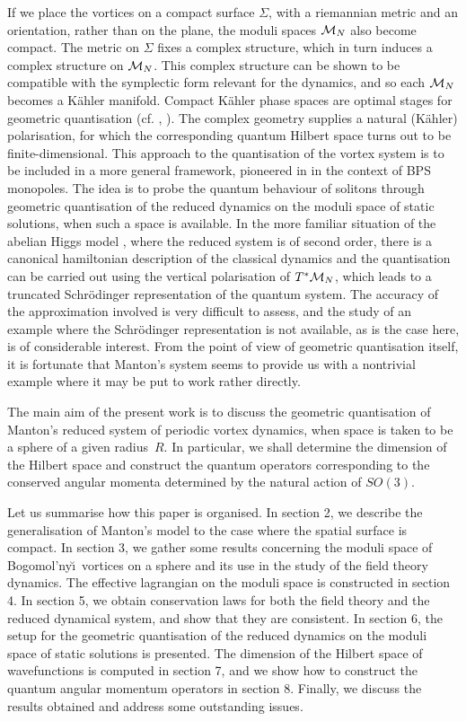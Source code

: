 \documentclass[a4paper,11pt]{article}
\begin{document}
If we place the vortices on a compact surface $\Sigma$, with a
riemannian metric and an orientation, rather than on the
plane, the moduli spaces ${\cal M}_{N}$ also become compact. 
The metric on $\Sigma$ fixes a complex structure, which in turn
induces a complex structure on ${\cal M}_{N}$.
This complex structure can be shown to be compatible with 
the symplectic form relevant for the dynamics, and so each ${\cal M}_{N}$
becomes a K\"ahler manifold.
Compact K\"ahler phase spaces are optimal stages for geometric 
quantisation (cf. \cite{Sni}, \cite{Woo}). 
The complex geometry supplies a natural (K\"ahler) polarisation, for
which the corresponding quantum Hilbert space turns out to be 
finite-dimensional.
This approach to the quantisation of the vortex system is to be
included in a more general framework, pioneered 
in \cite{GM} in the context of BPS monopoles. 
The idea is to probe the quantum behaviour of solitons through
geometric quantisation of the reduced dynamics on the moduli space of
static solutions, when such a space is available.
In the more familiar situation of the abelian Higgs model \cite{Sam},
where the reduced system is of
second order, there is a canonical hamiltonian description of the
classical dynamics and the quantisation can be carried out using the
vertical polarisation of $T^{*}{\cal M}_{N}$, which leads to a truncated
Schr\"odinger representation of the quantum system. The accuracy of
the approximation involved is very difficult to assess, and the study
of an example where the Schr\"odinger representation is not available,
as is the case here, is of
considerable interest. From the point of view of geometric
quantisation itself, it is fortunate that Manton's system
seems to provide us with a nontrivial example where it may be put to 
work rather directly.


The main aim of the present work is to discuss the
geometric quantisation of Manton's reduced system of periodic vortex 
dynamics, when space is taken to be a sphere of a given radius~$R$. In
particular, we shall determine the dimension of the Hilbert space
and construct the quantum operators corresponding to the 
conserved angular momenta determined by the natural action of $SO(3)$.


Let us summarise how this paper is organised.
In section 2, we describe the generalisation of Manton's model
to the case where the spatial surface is compact. 
In section 3, we gather some results concerning the moduli space of
Bogomol'ny\u \i\ vortices on a sphere and its use in the study of
the field theory dynamics. 
The effective lagrangian on the moduli space is constructed in section 4.
In section 5, we obtain conservation laws for both the field 
theory and the reduced dynamical system, and show that they are
consistent.
In section 6, the setup for the geometric quantisation
of the reduced dynamics on the moduli space of static 
solutions is presented. 
The dimension of the Hilbert space of wavefunctions is computed in 
section 7, and we show how to construct the quantum angular momentum 
operators in section 8.
Finally, we discuss the results obtained and address some outstanding
issues.
\end{document}
